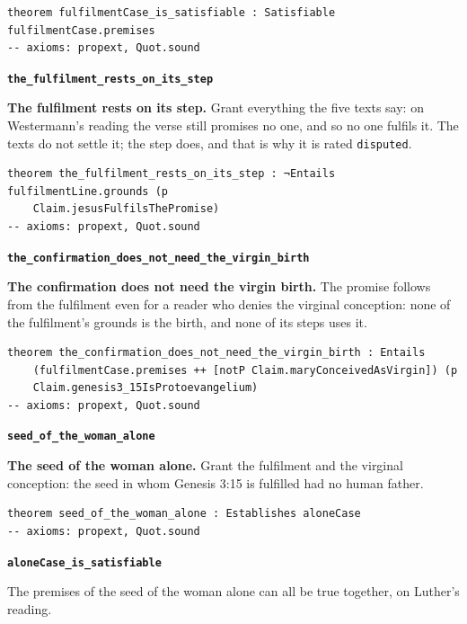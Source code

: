 \documentclass[11pt]{article}
\begin{document}
{\small\begin{verbatim}
theorem fulfilmentCase_is_satisfiable : Satisfiable fulfilmentCase.premises
-- axioms: propext, Quot.sound
\end{verbatim}}
\par\medskip\noindent\textbf{\texttt{the\_\allowbreak{}fulfilment\_\allowbreak{}rests\_\allowbreak{}on\_\allowbreak{}its\_\allowbreak{}step}}\par\nobreak\noindent
\textbf{The fulfilment rests on its step.} Grant everything the five texts say: on Westermann’s reading the verse still promises no one, and so no one fulfils it. The texts do not settle it; the step does, and that is why it is rated \texttt{disputed}.

{\small\begin{verbatim}
theorem the_fulfilment_rests_on_its_step : ¬Entails fulfilmentLine.grounds (p
    Claim.jesusFulfilsThePromise)
-- axioms: propext, Quot.sound
\end{verbatim}}
\par\medskip\noindent\textbf{\texttt{the\_\allowbreak{}confirmation\_\allowbreak{}does\_\allowbreak{}not\_\allowbreak{}need\_\allowbreak{}the\_\allowbreak{}virgin\_\allowbreak{}birth}}\par\nobreak\noindent
\textbf{The confirmation does not need the virgin birth.} The promise follows from the fulfilment even for a reader who denies the virginal conception: none of the fulfilment’s grounds is the birth, and none of its steps uses it.

{\small\begin{verbatim}
theorem the_confirmation_does_not_need_the_virgin_birth : Entails
    (fulfilmentCase.premises ++ [notP Claim.maryConceivedAsVirgin]) (p
    Claim.genesis3_15IsProtoevangelium)
-- axioms: propext, Quot.sound
\end{verbatim}}
\par\medskip\noindent\textbf{\texttt{seed\_\allowbreak{}of\_\allowbreak{}the\_\allowbreak{}woman\_\allowbreak{}alone}}\par\nobreak\noindent
\textbf{The seed of the woman alone.} Grant the fulfilment and the virginal conception: the seed in whom Genesis 3:15 is fulfilled had no human father.

{\small\begin{verbatim}
theorem seed_of_the_woman_alone : Establishes aloneCase
-- axioms: propext, Quot.sound
\end{verbatim}}
\par\medskip\noindent\textbf{\texttt{alone\allowbreak{}Case\_\allowbreak{}is\_\allowbreak{}satisfiable}}\par\nobreak\noindent
The premises of the seed of the woman alone can all be true together, on Luther’s reading.
\end{document}
